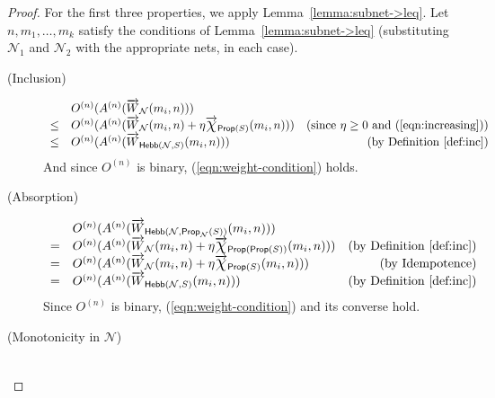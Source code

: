 \documentclass[letterpaper]{article}
\theoremstyle{definition}
\newcommand*{\bigchi}{\mbox{\Large$\chi$}}%
\newcommand{\Prop}{\textsf{Prop}}
\newcommand{\Inc}{\textsf{Hebb}}
\newcommand{\Net}{\mathcal{N}}
\begin{document}
\begin{proof} For the first three properties, we apply Lemma~\ref{lemma:subnet->leq}.  Let $n, m_1, \ldots, m_k$ satisfy the conditions of Lemma~\ref{lemma:subnet->leq} (substituting $\Net_1$ and $\Net_2$ with the appropriate nets, in each case).
\begin{description}
    \item[(Inclusion)]
    \[
    \begin{array}{llr}
    
    &
    O^{(n)}(A^{(n)}(\overrightarrow{W}_{\Net}(m_i, n))) &
    \\
    
    \leq &
    O^{(n)}(A^{(n)}(\overrightarrow{W}_{\Net}(m_i, n) + \eta \overrightarrow{\bigchi}_{\Prop(S)}(m_i, n))) & 
    \mbox{(since $\eta \geq 0$ and (\ref{eqn:increasing}))}\\
    
    \leq &
    O^{(n)}(A^{(n)}(\overrightarrow{W}_{\Inc(\Net, S)}(m_i, n))) & 
    \mbox{(by Definition~\ref{def:inc})}
    \end{array}
    \]
    And since $O^{(n)}$ is binary, (\ref{eqn:weight-condition}) holds.
    
    \item[(Absorption)] 
    \[
    \begin{array}{llr}
    
    &
    O^{(n)}(A^{(n)}(\overrightarrow{W}_{\Inc(\Net, \Prop_{\Net}(S))}(m_i, n))) & 
    \\
    
    = &
    O^{(n)}(A^{(n)}(\overrightarrow{W}_{\Net}(m_i, n) + \eta \overrightarrow{\bigchi}_{\Prop(\Prop(S))}(m_i, n))) &
    \mbox{(by Definition~\ref{def:inc})}\\
    
    = &
    O^{(n)}(A^{(n)}(\overrightarrow{W}_{\Net}(m_i, n) + \eta \overrightarrow{\bigchi}_{\Prop(S)}(m_i, n))) &
    \mbox{(by Idempotence)}\\
    
    = &
    O^{(n)}(A^{(n)}(\overrightarrow{W}_{\Inc(\Net, S)}(m_i, n))) & 
    \mbox{(by Definition~\ref{def:inc})}
    \end{array}
    \]
    Since $O^{(n)}$ is binary, (\ref{eqn:weight-condition}) and its converse hold.
    
    \item[(Monotonicity in $\Net$)] 
    \[
    \begin{array}{llr}
    

\end{array}\]
\end{description}
\end{proof}
\end{document}
